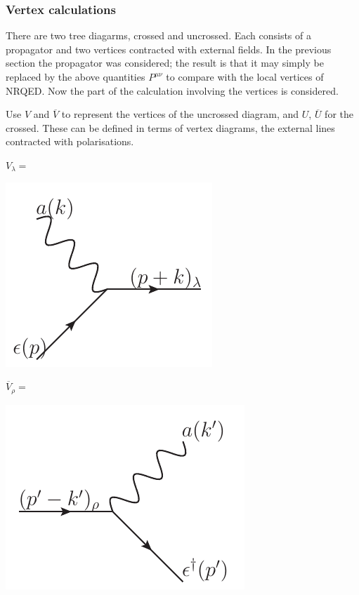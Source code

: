\subsubsection{Vertex calculations}

There are two tree diagarms, crossed and uncrossed.  Each consists of a propagator and two vertices contracted with external fields.  In the previous section the propagator was considered; the result is that it may simply be replaced by the above quantities $P^{\mu\nu}$ to compare with the local vertices of NRQED.    Now the part of the calculation involving the vertices is considered.

Use $V$ and $\overline{V}$ to represent the vertices of the uncrossed diagram, and $U$, $\overline{U}$ for the crossed.  These can be defined in terms of vertex diagrams, the external lines contracted with polarisations.

$V_\lambda = $
\begin{minipage}{1in}
   \includegraphics[scale=0.7]{eps/V-lambda} 
\end{minipage}
\hspace{8em}
$\overline{V}_\rho = $
\begin{minipage}{1in}
   \includegraphics[scale=0.7]{eps/V-bar-rho} 
\end{minipage}



